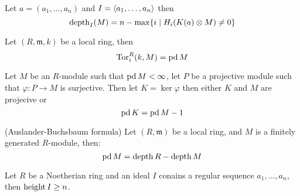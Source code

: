 \begin{definition}
\begin{lemma}
	\label{lem:koszul_homology_mesures_depth}
	Let $a = (a_1, \dots, a_n)$ and $I = \langle a_1, \dots, a_n\rangle$ then
	$$\operatorname{depth}_I(M) = n - \max\{i \mid H_i(K(a) \otimes M) \neq 0\}$$
\end{lemma}

\begin{lemma}
	\label{lem:tor_eq_pd_if_local}
	Let $(R, \mathfrak{m}, k)$ be a local ring, then
	$$\operatorname{Tor}_i^R(k, M) = \operatorname{pd} M$$
\end{lemma}

\begin{proposition}
	\label{prop:globdim_eq_projdim_of_residue}
\end{proposition}

\begin{lemma}
	\label{lem:projdim_ker_eq_one_less}
	Let $M$ be an $R$-module such that $\operatorname{pd} M < \infty$, let $P$ be a projective module such that $\varphi: P \to M$ is surjective.
	Then let $K = \ker \varphi$ then either $K$ and $M$ are projecive or
	$$\operatorname{pd} K = \operatorname{pd} M - 1$$
\end{lemma}

\begin{lemma}
	\label{lem:koszul_homotopy}
\end{lemma}

\begin{proposition}
	\label{prop:koszul_homology_annil_by_maximal}
\end{proposition}

\begin{theorem} (Auslander-Buchsbaum formula) Let $(R, \mathfrak{m})$ be a local ring, and $M$ is a finitely generated $R$-module, then:
	\label{thm:auslander_buchsbaum_formula}
	$$\operatorname{pd} M = \operatorname{depth} R - \operatorname{depth} M$$
\end{theorem}

\begin{lemma}
	\label{lem:depth_leq_ht}
	Let $R$ be a Noetherian ring and an ideal $I$ conains a regular sequence $a_1, \dots, a_n$, then $\operatorname{height} I \geq n$.
\end{lemma}


\end{definition}
